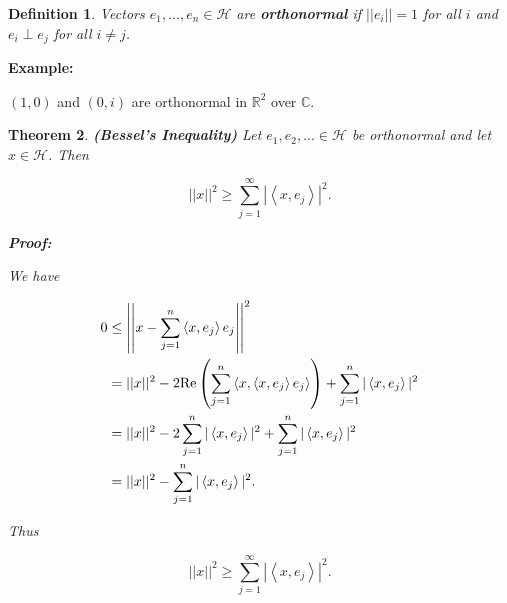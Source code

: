 \documentclass{article}
\theoremstyle{colontheorem}
\newtheorem{theorem}{Theorem}[section]
\newtheorem{definition}[theorem]{Definition}
\newenvironment{Theorem}
{
	\begin{mdframed}[backgroundcolor=TheoremOrange!10]
	\begin{theorem}
}
{
	\end{theorem}
	\end{mdframed}
	
	\vspace{.15in}
}
\newenvironment{Def}
{
	\begin{mdframed}[backgroundcolor=DefGreen!10]
	\begin{definition}
}
{
	\end{definition}
	\end{mdframed}
	
	\vspace{.15in}
}
\newenvironment{Proof}
{
	\begin{mdframed}[backgroundcolor=ProofPurple!10]
	\textbf{Proof:}%
}
{
	\end{mdframed}
	
	\vspace{.085in}
}
\newenvironment{Example}
{
	\begin{mdframed}
	\textbf{Example:}%
}
{
	\end{mdframed}
	
	\vspace{.15in}
}
\begin{document}
\begin{Def}
	
	Vectors $e_1, ..., e_n \in \mathcal{H}$ are \textbf{orthonormal} if $||e_i|| = 1$ for all $i$ and $e_i \perp e_j$ for all $i \neq j$.
	
\end{Def}



\begin{Example}
	$(1, 0)$ and $(0, i)$ are orthonormal in $\mathbb{R}^2$ over $\mathbb{C}$.
	
\end{Example}



\begin{Theorem}
	
	\textbf{(Bessel's Inequality)} Let $e_1, e_2, ... \in \mathcal{H}$ be orthonormal and let $x \in \mathcal{H}$. Then
	
	$$
		||x||^2 \geq \sum\limits_{j = 1}^\infty | \left< x, e_j \right> |^2.
	$$
	
	\begin{Proof}
		We have
		
		\begin{align*}
			0 &\leq \left| \left| x - \displaystyle\sum\limits_{j = 1}^n \left< x, e_j \right> e_j \right| \right|^2\\
			&= ||x||^2 - 2\textnormal{Re} \left( \displaystyle\sum\limits_{j = 1}^n \left< x, \left< x, e_j \right> e_j \right> \right) + \displaystyle\sum\limits_{j = 1}^n |\left< x, e_j \right>|^2\\
			&= ||x||^2 - 2\sum\limits_{j = 1}^n |\left< x, e_j \right>|^2 + \displaystyle\sum\limits_{j = 1}^n |\left< x, e_j \right>|^2\\
			&= ||x||^2 - \sum\limits_{j = 1}^n |\left< x, e_j \right>|^2.
		\end{align*}
		
		Thus
		
		$$
			||x||^2 \geq \sum\limits_{j = 1}^\infty | \left< x, e_j \right> |^2.
		$$
		
	\end{Proof}
	
\end{Theorem}
\end{document}
